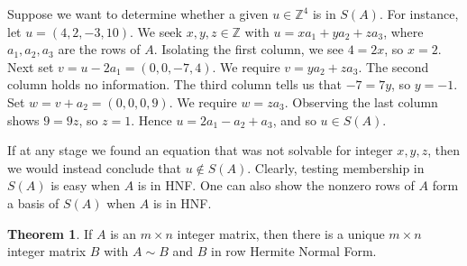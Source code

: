 \documentclass[12pt,a4paper]{article}
\newcommand{\Z}{\mathbb{Z}}
\theoremstyle{definition}
\newtheorem{theorem}{Theorem}[section]
\begin{document}
Suppose we want to determine whether a given $u\in\Z^4$ is in $S(A)$. For instance, let $u=(4,2,-3,10)$. We seek $x,y,z\in\Z$ with $u=xa_1+ya_2+za_3$, where $a_1,a_2,a_3$ are the rows of $A$. Isolating the first column, we see $4=2x$, so $x=2$. Next set $v=u-2a_1=(0,0,-7,4)$. We require $v=ya_2+za_3$. The second column holds no information. The third column tells us that $-7=7y$, so $y=-1$. Set $w=v+a_2=(0,0,0,9)$. We require $w=za_3$. Observing the last column shows $9=9z$, so $z=1$. Hence $u=2a_1-a_2+a_3$, and so $u\in S(A)$.

If at any stage we found an equation that was not solvable for integer $x,y,z$, then we would instead conclude that $u\notin S(A)$. Clearly, testing membership in $S(A)$ is easy when $A$ is in HNF. One can also show the nonzero rows of $A$ form a basis of $S(A)$ when $A$ is in HNF.

\begin{theorem}
  If $A$ is an $m\times n$ integer matrix, then there is a unique $m\times n$ integer matrix $B$ with $A\sim B$ and $B$ in row Hermite Normal Form.
\end{theorem}
\end{document}
